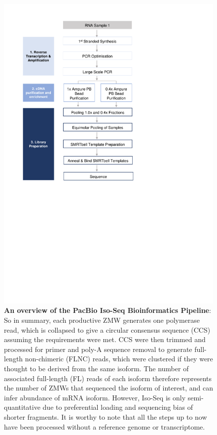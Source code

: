 \begin{figure}[htp]
	\centering
	\includegraphics[page=18,trim={0 7cm 0 0},clip,scale = 0.8]{Figures/ProjectDevelopment_Figures.pdf}
	\captionsetup{width=0.95\textwidth}
	\caption[PacBio Iso-Seq Bioinformatics Pipeline]%
	{\textbf{An overview of the PacBio Iso-Seq Bioinformatics Pipeline}: So in summary, each productive ZMW generates one polymerase read, which is collapsed to give a circular consensus sequence (CCS) assuming the requirements were met. CCS were then trimmed and processed for primer and poly-A sequence removal to generate full-length non-chimeric (FLNC) reads, which were clustered if they were thought to be derived from the same isoform. The number of associated full-length (FL) reads of each isoform therefore represents the number of ZMWs that sequenced the isoform of interest, and can infer abundance of mRNA isoform. However, Iso-Seq is only semi-quantitative due to preferential loading and sequencing bias of shorter fragments. It is worthy to note that all the steps up to now have been processed without a reference genome or transcriptome.}
	\label{fig:isoseq3_tool}
\end{figure}

